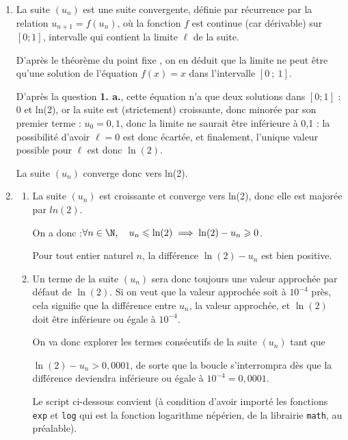 \begin{enumerate}
\begin{enumerate}
La suite étant croissante et majorée, on en déduit qu'elle est donc convergente, vers une limite $\ell$ vérifiant $0 \leqslant \ell \leqslant 1$.
		\end{enumerate}

		\item La suite $(u_n)$ est une suite convergente, définie par récurrence par la relation $u_{n+1} = f(u_n)$, où la fonction $f$ est continue (car dérivable) sur $ [0 ; 1] $, intervalle qui contient la limite $\ell$ de la suite.

D'après le théorème \og du point fixe \fg{}, on en déduit que la limite ne peut être qu'une solution de l'équation $f(x) = x$ dans l'intervalle $ [0~;~1] $.

D'après la question \textbf{1. a.}, cette équation n'a que deux solutions dans $ [0 ; 1] $ : 0 et ln(2), or la suite est (strictement) croissante, donc minorée par son premier terme : $u_0 = 0,1$, donc la limite ne saurait être inférieure à 0,1 : la possibilité d'avoir $\ell = 0$ est donc écartée, et finalement, l'unique valeur possible pour $\ell$ est donc $\ln(2)$.

La suite $(u_n)$ converge donc vers ln(2).

	\item \begin{enumerate}
		\item La suite $\left(u_n\right) $ est croissante et converge vers ln(2), donc elle est majorée par $ln (2)$.

On a donc :\quad $\forall n \in \N, \quad u_n \leqslant \ln(2) \implies \ln(2) - u_n \geqslant 0$.

Pour tout entier naturel $n$, la différence $\ln(2) - u_n$ est bien positive.

		\item Un terme de la suite $(u_n)$ sera donc toujours une valeur approchée par défaut de $\ln(2)$. Si on veut que la valeur approchée soit à $ 10^{-4} $ près, cela signifie que la différence entre $u_n$, la valeur approchée, et $\ln(2)$ doit être inférieure ou égale à $ 10^{-4} $.

On va donc explorer les termes consécutifs de la suite $(u_n)$ tant que 

$\ln(2) - u_n > 0,0001$, de sorte que la boucle s'interrompra dès que la différence deviendra inférieure ou égale à $ 10^{-4} = 0,0001 $.

Le script ci-dessous convient (à condition d'avoir importé les fonctions \texttt{exp} et \texttt{log} qui est la fonction logarithme népérien,  de la librairie \texttt{math}, au préalable).


\end{enumerate}
\end{enumerate}
